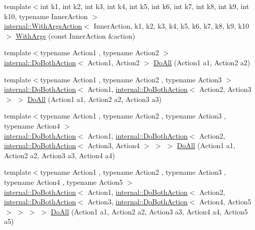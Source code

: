 \begin{DoxyCompactItemize}
\item 
{\footnotesize template$<$int k1, int k2, int k3, int k4, int k5, int k6, int k7, int k8, int k9, int k10, typename Inner\+Action $>$ }\\\hyperlink{classtesting_1_1internal_1_1WithArgsAction}{internal\+::\+With\+Args\+Action}$<$ Inner\+Action, k1, k2, k3, k4, k5, k6, k7, k8, k9, k10 $>$ \hyperlink{namespacetesting_a768a620ad07c6b5822201fa4f15fb4f0}{With\+Args} (const Inner\+Action \&action)
\item 
{\footnotesize template$<$typename Action1 , typename Action2 $>$ }\\\hyperlink{classtesting_1_1internal_1_1DoBothAction}{internal\+::\+Do\+Both\+Action}$<$ Action1, Action2 $>$ \hyperlink{namespacetesting_a5f533932753d2af95000e96c4a3042e3}{Do\+All} (Action1 a1, Action2 a2)
\item 
{\footnotesize template$<$typename Action1 , typename Action2 , typename Action3 $>$ }\\\hyperlink{classtesting_1_1internal_1_1DoBothAction}{internal\+::\+Do\+Both\+Action}$<$ Action1, \hyperlink{classtesting_1_1internal_1_1DoBothAction}{internal\+::\+Do\+Both\+Action}$<$ Action2, Action3 $>$ $>$ \hyperlink{namespacetesting_ad6a3ce5e229120ea287286a86394d712}{Do\+All} (Action1 a1, Action2 a2, Action3 a3)
\item 
{\footnotesize template$<$typename Action1 , typename Action2 , typename Action3 , typename Action4 $>$ }\\\hyperlink{classtesting_1_1internal_1_1DoBothAction}{internal\+::\+Do\+Both\+Action}$<$ Action1, \hyperlink{classtesting_1_1internal_1_1DoBothAction}{internal\+::\+Do\+Both\+Action}$<$ Action2, \hyperlink{classtesting_1_1internal_1_1DoBothAction}{internal\+::\+Do\+Both\+Action}$<$ Action3, Action4 $>$ $>$ $>$ \hyperlink{namespacetesting_a790ce08c80a1f8ececa0f2a4f678247c}{Do\+All} (Action1 a1, Action2 a2, Action3 a3, Action4 a4)
\item 
{\footnotesize template$<$typename Action1 , typename Action2 , typename Action3 , typename Action4 , typename Action5 $>$ }\\\hyperlink{classtesting_1_1internal_1_1DoBothAction}{internal\+::\+Do\+Both\+Action}$<$ Action1, \hyperlink{classtesting_1_1internal_1_1DoBothAction}{internal\+::\+Do\+Both\+Action}$<$ Action2, \hyperlink{classtesting_1_1internal_1_1DoBothAction}{internal\+::\+Do\+Both\+Action}$<$ Action3, \hyperlink{classtesting_1_1internal_1_1DoBothAction}{internal\+::\+Do\+Both\+Action}$<$ Action4, Action5 $>$ $>$ $>$ $>$ \hyperlink{namespacetesting_a794c41d43373d7af9cebbc7f1c5e4a57}{Do\+All} (Action1 a1, Action2 a2, Action3 a3, Action4 a4, Action5 a5)

\end{DoxyCompactItemize}
